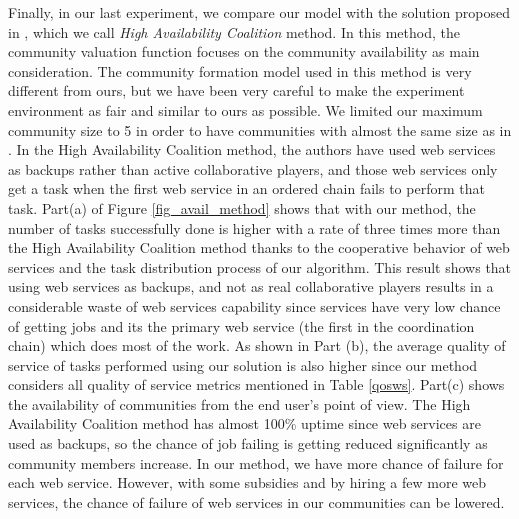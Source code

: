 \documentclass[10pt,journal,cspaper,compsoc]{IEEEtran}
\begin{document}
Finally, in our last experiment, we compare our model with the
solution proposed in \cite{10.1109/TSC.2012.12}, which we call
\emph{High Availability Coalition} method. In this method, the
community valuation function focuses on the community availability
as main consideration. The community formation model used in this
method is very different from ours, but we have been very careful
to make the experiment environment as fair and similar to ours as
possible. We limited our maximum community size to 5 in order to
have communities with almost the same size as in
\cite{10.1109/TSC.2012.12}. In the High Availability Coalition
method, the authors have used web services as backups rather than
active collaborative players, and those web services only get a
task when the first web service in an ordered chain fails to
perform that task. %
Part(a) of Figure \ref{fig_avail_method} shows that with our
method, the number of tasks successfully done is higher with a
rate of three times more than the High Availability Coalition
method thanks to the cooperative behavior of web services and the
task distribution process of our algorithm. This result shows that
using web services as backups, and not as real collaborative
players results in a considerable waste of web services capability
since services have very low chance of getting jobs and its the
primary web service (the first in the coordination chain) which
does most of the work. As shown in Part (b), the average quality
of service of tasks performed using our solution is also higher
since our method considers all quality of service metrics
mentioned in Table \ref{qosws}. Part(c) shows the availability of
communities from the end user's point of view. The High
Availability Coalition method has almost 100\% uptime since web
services are used as backups, so the chance of job failing is
getting reduced significantly as community members increase. In
our method, we have more chance of failure for each web service.
However, with some subsidies and by hiring a few more web
services, the chance of failure of web services in our communities
can be lowered.



\end{document}
